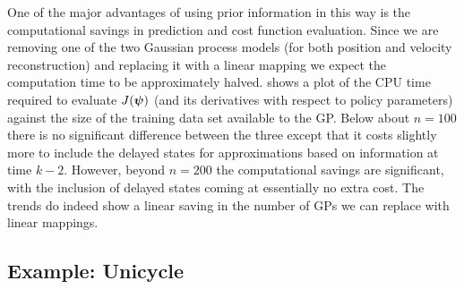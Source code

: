 One of the major advantages of using prior information in this way is the computational savings in prediction and cost function evaluation. Since we are removing one of the two Gaussian process models (for both position and velocity reconstruction) and replacing it with a linear mapping we expect the computation time to be approximately halved.  shows a plot of the CPU time required to evaluate $J(\boldsymbol{\psi})$ (and its derivatives with respect to policy parameters) against the size of the training data set available to the GP. Below about $n=100$ there is no significant difference between the three except that it costs slightly more to include the delayed states for approximations based on information at time $k-2$. However, beyond $n=200$ the computational savings are significant, with the inclusion of delayed states coming at essentially no extra cost. The trends do indeed show a linear saving in the number of GPs we can replace with linear mappings.









\subsection{Example: Unicycle} \label{sec:unicycle}








